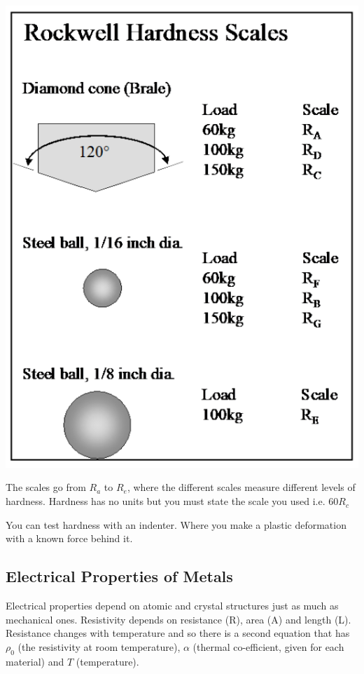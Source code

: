 \documentclass[12pt]{article}
\begin{document}
\begin{multicols}{2}
\includegraphics[scale=0.2]{rockwell}

The scales go from $R_a$ to $R_e$, where the different scales measure different levels of hardness.
Hardness has no units but you must state the scale you used i.e. 60$R_c$

You can test hardness with an indenter.
Where you make a plastic deformation with a known force behind it.

\end{multicols}

\subsection{Electrical Properties of Metals}
Electrical properties depend on atomic and crystal structures just as much as mechanical ones.
Resistivity depends on resistance (R), area (A) and length (L).
Resistance changes with temperature and so there is a second equation that has $\rho_0$ (the resistivity at room temperature), $\alpha$ (thermal co-efficient, given for each material) and $T$ (temperature).
\end{document}
